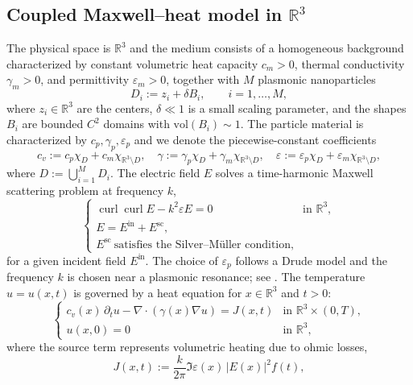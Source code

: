 \documentclass[11pt,a4paper]{article}
\numberwithin{equation}{section}
\theoremstyle{definition}
\newcommand{\R}{\mathbb{R}}
\newcommand{\eps}{\varepsilon}
\newcommand{\1}{\mathbbm{1}}
\begin{document}
\subsection{Coupled Maxwell--heat model in $\R^3$}
\noindent
The physical space is $\R^3$ and the medium consists of a homogeneous
background characterized by constant volumetric heat capacity $c_m>0$,
thermal conductivity $\gamma_m>0$, and permittivity $\eps_m>0$, together with
$M$ plasmonic nanoparticles
\[
D_i := z_i + \delta B_i,\qquad i=1,\dots,M,
\]
where $z_i\in\R^3$ are the centers, $\delta\ll1$ is a small scaling
parameter, and the shapes $B_i$ are bounded $C^2$ domains with
$\mathrm{vol}(B_i)\sim1$. The particle material is characterized by
$c_p,\gamma_p,\eps_p$ and we denote the piecewise-constant coefficients
\[
c_v := c_p\chi_D + c_m\chi_{\R^3\setminus D},\quad
\gamma := \gamma_p\chi_D + \gamma_m\chi_{\R^3\setminus D},\quad
\eps := \eps_p\chi_D + \eps_m\chi_{\R^3\setminus D},
\]
where $D:=\bigcup_{i=1}^M D_i$.
\newline
The electric field $E$ solves a time-harmonic Maxwell scattering problem at
frequency $k$,
\begin{equation}
\label{eq:maxwell}
\begin{cases}
\operatorname{curl}\operatorname{curl}E - k^2\eps E = 0 & \text{in }\R^3,\\
E = E^{\mathrm{in}} + E^{\mathrm{sc}},\\
E^{\mathrm{sc}}\ \text{satisfies the Silver--M\"uller condition,}
\end{cases}
\end{equation}
for a given incident field $E^{\mathrm{in}}$. The choice of $\eps_p$
follows a Drude model and the frequency $k$ is chosen near a plasmonic
resonance; see \cite{AmmariRomeroRuiz2018,
CaoMukherjeeSini2025, Mukherjee2022}.
\newline
The temperature $u=u(x,t)$ is governed by a heat equation for $x\in\R^3$ and
$t>0$:
\begin{equation}
\label{eq:heat-transmission}
\begin{cases}
c_v(x)\,\partial_t u - \nabla\cdot(\gamma(x)\nabla u) = J(x,t)
& \text{in }\R^3\times(0,T),\\[0.3em]
u(x,0) = 0 & \text{in }\R^3,
\end{cases}
\end{equation}
where the source term represents volumetric heating due to ohmic losses,
\begin{equation}\label{eq:heat=J}
J(x,t) := \frac{k}{2\pi}\Im\eps(x)\,|E(x)|^2 f(t),
\end{equation}
\end{document}
